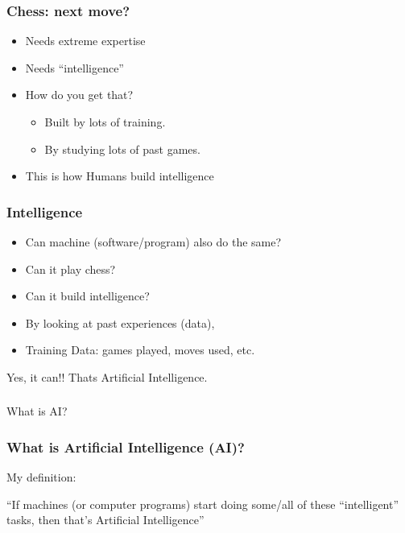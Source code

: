 \begin{frame}[fragile]\frametitle{Chess: next move?}
\begin{itemize}
\item Needs extreme expertise
\item Needs ``intelligence''
\item How do you get that?
\begin{itemize}
\item Built by lots of training.
\item By studying lots of past games.
\end{itemize}
\item This is how Humans build intelligence
\end{itemize}
\end{frame}

\begin{frame}[fragile]\frametitle{Intelligence}
\begin{itemize}
\item Can machine (software/program) also do the same?
\item Can it play chess?
\item Can it build intelligence?
\item By looking at past experiences (data), 
\item Training Data: games played, moves used, etc.
\end{itemize}
Yes, it can!! Thats Artificial Intelligence.
\end{frame}

\begin{frame}[fragile]\frametitle{}
\begin{center}
{\Large What is AI?}
\end{center}
\end{frame}



\begin{frame}[fragile]\frametitle{ What is Artificial Intelligence (AI)?}
My definition:


``If machines (or computer programs) start doing some/all of these ``intelligent'' tasks, then that's Artificial Intelligence''

\end{frame}

